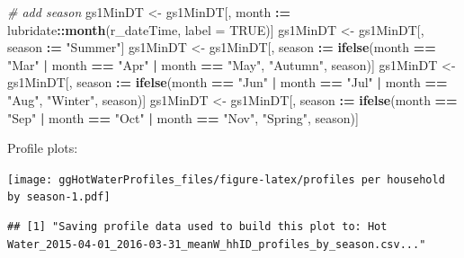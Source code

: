 \documentclass[]{article}
\newenvironment{Shaded}{\begin{snugshade}}{\end{snugshade}}
\newcommand{\KeywordTok}[1]{\textcolor[rgb]{0.13,0.29,0.53}{\textbf{#1}}}
\newcommand{\DataTypeTok}[1]{\textcolor[rgb]{0.13,0.29,0.53}{#1}}
\newcommand{\StringTok}[1]{\textcolor[rgb]{0.31,0.60,0.02}{#1}}
\newcommand{\CommentTok}[1]{\textcolor[rgb]{0.56,0.35,0.01}{\textit{#1}}}
\newcommand{\OtherTok}[1]{\textcolor[rgb]{0.56,0.35,0.01}{#1}}
\newcommand{\OperatorTok}[1]{\textcolor[rgb]{0.81,0.36,0.00}{\textbf{#1}}}
\newcommand{\ErrorTok}[1]{\textcolor[rgb]{0.64,0.00,0.00}{\textbf{#1}}}
\newcommand{\NormalTok}[1]{#1}
\begin{document}
\begin{Shaded}
\begin{Highlighting}[]
\CommentTok{# add season}
\NormalTok{gs1MinDT <-}\StringTok{ }\NormalTok{gs1MinDT[, month }\OperatorTok{:}\ErrorTok{=}\StringTok{ }\NormalTok{lubridate}\OperatorTok{::}\KeywordTok{month}\NormalTok{(r_dateTime, }\DataTypeTok{label =} \OtherTok{TRUE}\NormalTok{)]}
\NormalTok{gs1MinDT <-}\StringTok{ }\NormalTok{gs1MinDT[, season }\OperatorTok{:}\ErrorTok{=}\StringTok{ "Summer"}\NormalTok{]}
\NormalTok{gs1MinDT <-}\StringTok{ }\NormalTok{gs1MinDT[, season }\OperatorTok{:}\ErrorTok{=}\StringTok{ }\KeywordTok{ifelse}\NormalTok{(month }\OperatorTok{==}\StringTok{ "Mar"} \OperatorTok{|}
\StringTok{                                              }\NormalTok{month }\OperatorTok{==}\StringTok{ "Apr"} \OperatorTok{|}
\StringTok{                                              }\NormalTok{month }\OperatorTok{==}\StringTok{ "May"}\NormalTok{, }\StringTok{"Autumn"}\NormalTok{, season)]}
\NormalTok{gs1MinDT <-}\StringTok{ }\NormalTok{gs1MinDT[, season }\OperatorTok{:}\ErrorTok{=}\StringTok{ }\KeywordTok{ifelse}\NormalTok{(month }\OperatorTok{==}\StringTok{ "Jun"} \OperatorTok{|}
\StringTok{                                              }\NormalTok{month }\OperatorTok{==}\StringTok{ "Jul"} \OperatorTok{|}
\StringTok{                                              }\NormalTok{month }\OperatorTok{==}\StringTok{ "Aug"}\NormalTok{, }\StringTok{"Winter"}\NormalTok{, season)]}
\NormalTok{gs1MinDT <-}\StringTok{ }\NormalTok{gs1MinDT[, season }\OperatorTok{:}\ErrorTok{=}\StringTok{ }\KeywordTok{ifelse}\NormalTok{(month }\OperatorTok{==}\StringTok{ "Sep"} \OperatorTok{|}
\StringTok{                                              }\NormalTok{month }\OperatorTok{==}\StringTok{ "Oct"} \OperatorTok{|}
\StringTok{                                              }\NormalTok{month }\OperatorTok{==}\StringTok{ "Nov"}\NormalTok{, }\StringTok{"Spring"}\NormalTok{, season)]}
\end{Highlighting}
\end{Shaded}

Profile plots:

\texttt{[image: ggHotWaterProfiles\_files/figure-latex/profiles per household by season-1.pdf]}

\begin{verbatim}
## [1] "Saving profile data used to build this plot to: Hot Water_2015-04-01_2016-03-31_meanW_hhID_profiles_by_season.csv..."
\end{verbatim}
\end{document}
